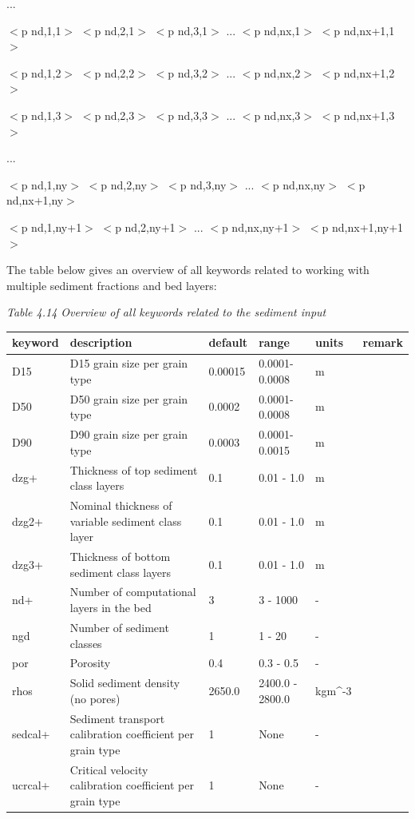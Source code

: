 \documentclass{article}
\begin{document}
\noindent 

\noindent ...

\noindent 

\noindent $<$p nd,1,1$>$ $<$p nd,2,1$>$ $<$p nd,3,1$>$ ... $<$p nd,nx,1$>$ $<$p nd,nx+1,1$>$

\noindent $<$p nd,1,2$>$ $<$p nd,2,2$>$ $<$p nd,3,2$>$ ... $<$p nd,nx,2$>$ $<$p nd,nx+1,2$>$

\noindent $<$p nd,1,3$>$ $<$p nd,2,3$>$ $<$p nd,3,3$>$ ... $<$p nd,nx,3$>$ $<$p nd,nx+1,3$>$

\noindent ...

\noindent $<$p nd,1,ny$>$ $<$p nd,2,ny$>$ $<$p nd,3,ny$>$ ... $<$p nd,nx,ny$>$ $<$p nd,nx+1,ny$>$

\noindent $<$p nd,1,ny+1$>$ $<$p nd,2,ny+1$>$ ... $<$p nd,nx,ny+1$>$ $<$p nd,nx+1,ny+1$>$

\noindent The table below gives an overview of all keywords related to working with multiple sediment fractions and bed layers:

\noindent \textit{Table 4.14 Overview of all keywords related to the sediment input}

\begin{tabular}{|p{0.6in}|p{1.0in}|p{0.6in}|p{1.0in}|p{0.4in}|p{0.6in}|} \hline 
keyword & description & default & range & units & remark \\ \hline 
D15 & D15 grain size per grain type & 0.00015 & 0.0001-0.0008 & m &  \\ \hline 
D50 & D50 grain size per grain type & 0.0002 & 0.0001-0.0008 & m &  \\ \hline 
D90 & D90 grain size per grain type & 0.0003 & 0.0001-0.0015 & m &  \\ \hline 
dzg+ & Thickness of top sediment class layers & 0.1 & 0.01 - 1.0 & m &  \\ \hline 
dzg2+ & Nominal thickness of variable sediment class layer & 0.1 & 0.01 - 1.0 & m &  \\ \hline 
dzg3+ & Thickness of bottom sediment class layers & 0.1 & 0.01 - 1.0 & m &  \\ \hline 
nd+ & Number of computational layers in the bed & 3 & 3 - 1000 & - &  \\ \hline 
ngd & Number of sediment classes & 1 & 1 - 20 & - &  \\ \hline 
por & Porosity & 0.4 & 0.3 - 0.5 & - &  \\ \hline 
rhos & Solid sediment density (no pores) & 2650.0 & 2400.0 - 2800.0 & kgm\^{}-3 &  \\ \hline 
sedcal+ & Sediment transport calibration coefficient per grain type & 1 & None & - &  \\ \hline 
ucrcal+ & Critical velocity calibration coefficient per grain type & 1 & None & - &  \\ \hline 
\end{tabular}
\end{document}
